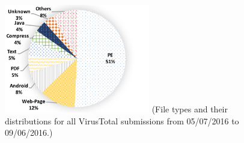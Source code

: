 \begin{figure}[t!]
\begin{center}
\includegraphics[width=2.5in]{figure/type}
{\footnotesize{(File types and their distributions for all VirusTotal submissions from 05/07/2016 to 09/06/2016.)}}
\end{center}
\end{figure}
